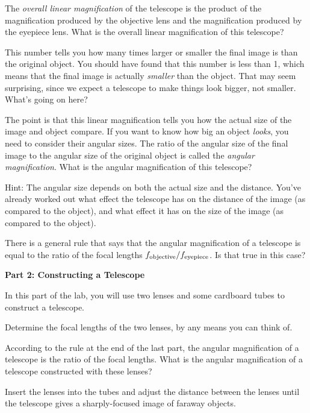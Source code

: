 \vskip 1in

The {\it overall linear magnification} of the telescope is the product
of the magnification produced by the objective lens and the magnification
produced by the eyepiece lens.  What is the overall 
linear magnification of this
telescope?

\vskip 1in

This number tells you how many times larger or smaller the final image
is than the original object.  
You should have found that this number is less than 1, which means
that the final image is actually {\it smaller} than the object.
That may seem surprising, since we expect a telescope to make
things look bigger, not smaller.  What's going on here?

The point is that this linear magnification tells you how the
actual size of the image and object compare.  If you want to know
how big an object {\it looks}, you need to consider their
angular sizes.  The ratio of the angular size of the
final image to the angular size of the original object
is called the {\it angular magnification}.
What is the angular magnification of this telescope?

Hint: The angular size depends on both the actual size and the
distance.  You've already worked out what effect the telescope has on
the distance of the image (as compared to the object), and what effect
it has on the size of the image (as compared to the object).


\vskip 1.5in

There is a general rule that says that the angular magnification
of a telescope is equal to the ratio of the focal lengths $f_{\rm objective}/
f_{\rm eyepiece}$.  Is that true in this case?

\vskip 1in

{\bf Part 2: Constructing a Telescope}

In this part of the lab, you will use two lenses and some cardboard tubes
to construct a telescope.  

Determine the focal lengths of the two lenses, by any means you 
can think of.

\vskip 1in

According to the rule at the end of the last part, the angular
magnification of a telescope is the ratio of the focal lengths.
What is the angular magnification of a telescope constructed with
these lenses?

\vskip 1in

Insert the lenses into the tubes and adjust the distance between the lenses
until the telescope gives a sharply-focused image of faraway objects.

